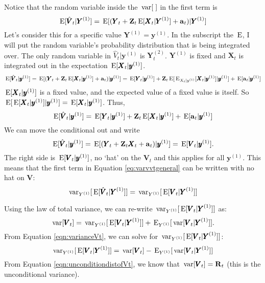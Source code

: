 \documentclass[]{article}
\def\XI{\mbox{\boldmath $\Xi$}}
\def\E{\,\textup{\textrm{E}}}
\def\RR{\mbox{$\mathbf R$}}	 \def\rr{\mbox{$\mathbf r$}} \def\Rb{\mbox{$\mathbf H$}}	\def\Rm{\mathbb{R}}
\def\VV{\mbox{$\pmb{V}$}}	\def\vv{\mbox{$\pmb{v}$}}
\def\XX{\mbox{$\pmb{X}$}}	\def\xx{\mbox{$\pmb{x}$}}
\def\YY{\mbox{$\pmb{Y}$}}	\def\yy{\mbox{$\pmb{y}$}}
\def\ZZ{\mbox{$\mathbf Z$}}	\def\zz{\mbox{$\mathbf z$}}	\def\Zb{\mbox{$\mathbf M$}} \def\Za{\mbox{$\mathbf N$}} \def\Zm{\XI}
\def\var{\,\textup{\textrm{var}}}
\begin{document}
Notice that the random variable inside the $\var[\;]$ in the first term is
\begin{equation}
\E[\hat{\VV}_t|\YY^{(1)}]= \E[(\YY_t + \ZZ_t \E[\XX_t|\YY^{(1)}] + \aa_t)|\YY^{(1)}] 
\end{equation}
Let's consider this for a specific value $\YY^{(1)}=\yy^{(1)}$. In the subscript the $\E$, I will put the random variable's probability distribution that is being integrated over. The only random variable in $\hat{V}_t|\yy^{(1)}$ is $\YY_t^{(2)}$. $\YY^{(1)}$ is fixed and $\XX_t$ is integrated out in the expectation $\E[\XX_t|\yy^{(1)}]$.
\begin{equation}
\E[\hat{\VV}_t|\yy^{(1)}]= \E[(\YY_t + \ZZ_t \E[\XX_t|\yy^{(1)}] + \aa_t)|\yy^{(1)}] =
\E[\YY_t|\yy^{(1)}] + \ZZ_t \E[\E_{X_t|y^{(1)}}[\XX_t|\yy^{(1)}]|\yy^{(1)}] + \E[\aa_t|\yy^{(1)}]
\end{equation}
$\E[\XX_t|\yy^{(1)}]$ is a fixed value, and the expected value of a fixed value is itself. So
$\E[\E[\XX_t|\yy^{(1)}]|\yy^{(1)}]=\E[\XX_t|\yy^{(1)}]$. 
Thus,
\begin{equation}
\E[\hat{\VV}_t|\yy^{(1)}] = \E[\YY_t|\yy^{(1)}] + \ZZ_t \E[\XX_t|\yy^{(1)}] + \E[\aa_t|\yy^{(1)}]
\end{equation}
We can move the conditional out and write
\begin{equation}
\E[\hat{\VV}_t|\yy^{(1)}]= \E[(\YY_t + \ZZ_t \XX_t + \aa_t)|\yy^{(1)}]=\E[\VV_t|\yy^{(1)}].
\end{equation}
The right side is $\E[\VV_t|\yy^{(1)}]$, no `hat' on the $\VV_t$ and this applies for all $\yy^{(1)}$. 
 This means that the first term in Equation \ref{eq:varvvtgeneral} can be written with no hat on $\VV$:
\begin{equation}\label{eq:no.hat.on.V}
\var_{Y^{(1)}}[\E[\hat{\VV}_t|\YY^{(1)}]] = \var_{Y^{(1)}}[\E[\VV_t|\YY^{(1)}]]
\end{equation}

Using the law of total variance, we can re-write $\var_{Y^{(1)}}[\E[\VV_t|\YY^{(1)}]]$ as:
\begin{equation}\label{eqn:varianceVt}
\var[\VV_t] = \var_{Y^{(1)}}[\E[\VV_t|\YY^{(1)}]] + \E_{Y^{(1)}}[\var[\VV_t|\YY^{(1)}]].
\end{equation}
From Equation \ref{eqn:varianceVt}, we can solve for $\var_{Y^{(1)}}[\E[\VV_t|\YY^{(1)}]]$:
\begin{equation}\label{eq:var.E.vtT}
\var_{Y^{(1)}}[\E[\VV_t|\YY^{(1)}]] = \var[\VV_t] - \E_{Y^{(1)}}[\var[\VV_t|\YY^{(1)}]]
\end{equation}
From Equation \ref{eqn:unconditiondistofVt}, we know that $\var[\VV_t]=\RR_t$ (this is the unconditional variance).  
\end{document}
